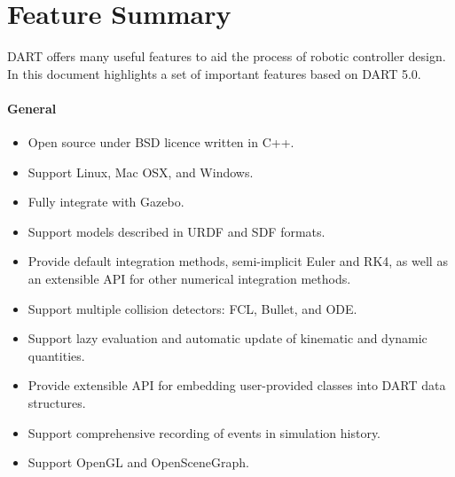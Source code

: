 \section{Feature Summary}
DART offers many useful features to aid the process of robotic controller design. In this document highlights a set of important features based on DART 5.0.

\paragraph{General}
\begin{itemize}[leftmargin=*] \itemsep1pt \parskip0pt 
  \item Open source under BSD licence written in C++.
  \item Support Linux, Mac OSX, and Windows.
  \item Fully integrate with Gazebo.
  \item Support models described in URDF and SDF formats.
  \item Provide default integration methods, semi-implicit Euler and RK4, as well as an extensible API for other numerical integration methods.
  \item Support multiple collision detectors: FCL, Bullet, and ODE.
  \item Support lazy evaluation and automatic update of kinematic and dynamic quantities.
  \item Provide extensible API for embedding user-provided classes into DART data structures.
  \item Support comprehensive recording of events in simulation history.
  \item Support OpenGL and OpenSceneGraph.
\end{itemize}




